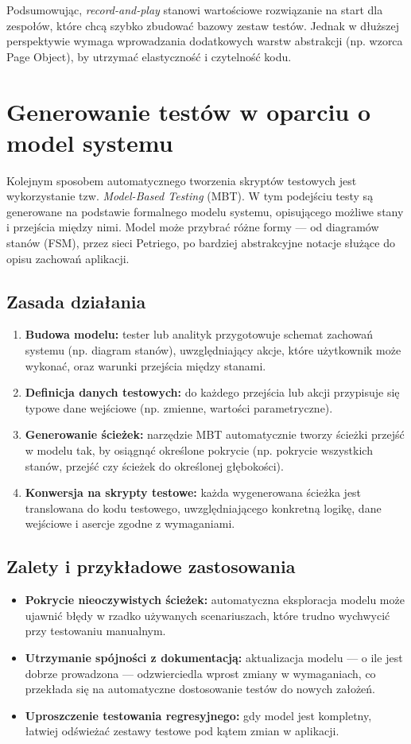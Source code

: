 \documentclass[12pt]{report}
\begin{document}
Podsumowując, \emph{record-and-play} stanowi wartościowe rozwiązanie na start dla zespołów, które chcą szybko zbudować bazowy zestaw testów. Jednak w dłuższej perspektywie wymaga wprowadzania dodatkowych warstw abstrakcji (np. wzorca Page Object), by utrzymać elastyczność i czytelność kodu.

\section{Generowanie testów w oparciu o model systemu}
\label{sec:generowanie-model}

Kolejnym sposobem automatycznego tworzenia skryptów testowych jest wykorzystanie tzw. \emph{Model-Based Testing} (MBT). W tym podejściu testy są generowane na podstawie formalnego modelu systemu, opisującego możliwe stany i przejścia między nimi. Model może przybrać różne formy — od diagramów stanów (FSM), przez sieci Petriego, po bardziej abstrakcyjne notacje służące do opisu zachowań aplikacji.

\subsection*{Zasada działania}
\begin{enumerate}
    \item \textbf{Budowa modelu:} tester lub analityk przygotowuje schemat zachowań systemu (np. diagram stanów), uwzględniający akcje, które użytkownik może wykonać, oraz warunki przejścia między stanami.
    \item \textbf{Definicja danych testowych:} do każdego przejścia lub akcji przypisuje się typowe dane wejściowe (np. zmienne, wartości parametryczne).
    \item \textbf{Generowanie ścieżek:} narzędzie MBT automatycznie tworzy ścieżki przejść w modelu tak, by osiągnąć określone pokrycie (np. pokrycie wszystkich stanów, przejść czy ścieżek do określonej głębokości).
    \item \textbf{Konwersja na skrypty testowe:} każda wygenerowana ścieżka jest translowana do kodu testowego, uwzględniającego konkretną logikę, dane wejściowe i asercje zgodne z wymaganiami.
\end{enumerate}

\subsection*{Zalety i przykładowe zastosowania}
\begin{itemize}
    \item \textbf{Pokrycie nieoczywistych ścieżek:} automatyczna eksploracja modelu może ujawnić błędy w rzadko używanych scenariuszach, które trudno wychwycić przy testowaniu manualnym.
    \item \textbf{Utrzymanie spójności z dokumentacją:} aktualizacja modelu — o ile jest dobrze prowadzona — odzwierciedla wprost zmiany w wymaganiach, co przekłada się na automatyczne dostosowanie testów do nowych założeń.
    \item \textbf{Uproszczenie testowania regresyjnego:} gdy model jest kompletny, łatwiej odświeżać zestawy testowe pod kątem zmian w aplikacji.
\end{itemize}
\end{document}

